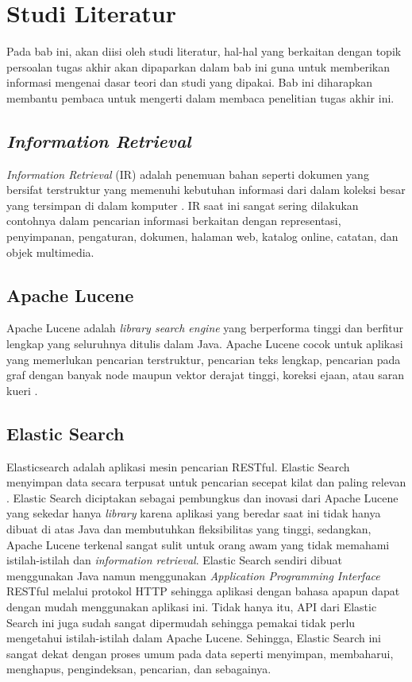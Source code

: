 \chapter{Studi Literatur}

Pada bab ini, akan diisi oleh studi literatur, hal-hal yang berkaitan dengan topik persoalan tugas akhir akan dipaparkan dalam bab ini guna untuk memberikan informasi mengenai dasar teori dan studi yang dipakai. Bab ini diharapkan membantu pembaca untuk mengerti dalam membaca penelitian tugas akhir ini.

\section{\textit{Information Retrieval}}
\textit{Information Retrieval} (IR) adalah penemuan bahan seperti dokumen yang bersifat terstruktur yang memenuhi kebutuhan informasi dari dalam koleksi besar yang tersimpan di dalam komputer \parencite{introtoinforetri}. IR saat ini sangat sering dilakukan contohnya dalam pencarian informasi berkaitan dengan representasi, penyimpanan, pengaturan, dokumen, halaman web, katalog online, catatan, dan objek multimedia. 

\section{Apache Lucene}
Apache Lucene adalah \textit{library search engine} yang berperforma tinggi dan berfitur lengkap yang seluruhnya ditulis dalam Java. Apache Lucene cocok untuk aplikasi yang memerlukan pencarian terstruktur, pencarian teks lengkap, pencarian pada graf dengan banyak node maupun vektor derajat tinggi, koreksi ejaan, atau saran kueri \parencite{apachelucene}.

\section{Elastic Search}
Elasticsearch adalah aplikasi mesin pencarian RESTful. Elastic Search menyimpan data secara terpusat untuk pencarian secepat kilat dan paling relevan \parencite{elasticsearchorigin}. Elastic Search diciptakan sebagai pembungkus dan inovasi dari Apache Lucene yang sekedar hanya \textit{library} karena aplikasi yang beredar saat ini tidak hanya dibuat di atas Java dan membutuhkan fleksibilitas yang tinggi, sedangkan, Apache Lucene terkenal sangat sulit untuk orang awam yang tidak memahami istilah-istilah dan \textit{information retrieval}. Elastic Search sendiri dibuat menggunakan Java namun menggunakan \textit{Application Programming Interface} RESTful melalui protokol HTTP sehingga aplikasi dengan bahasa apapun dapat dengan mudah menggunakan aplikasi ini. Tidak hanya itu, API dari Elastic Search ini juga sudah sangat dipermudah sehingga pemakai tidak perlu mengetahui istilah-istilah dalam Apache Lucene. Sehingga, Elastic Search ini sangat dekat dengan proses umum pada data seperti menyimpan, membaharui, menghapus, pengindeksan, pencarian, dan sebagainya.

